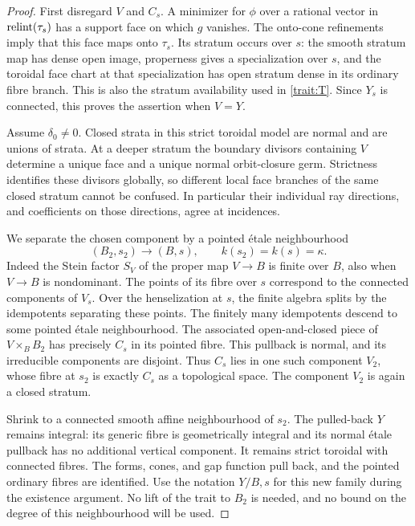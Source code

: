 \begin{proof}
First disregard $V$ and $C_s$.  A minimizer for $\phi$ over a rational
vector in $\operatorname{relint}(\tau_s)$ has a support face on which $g$ vanishes.
The onto-cone refinements imply that this face maps onto $\tau_s$.
Its stratum occurs over $s$: the smooth stratum map has dense open
image, properness gives a specialization over $s$, and the toroidal
face chart at that specialization has open stratum dense in its
ordinary fibre branch.  This is also the stratum availability used
in \eqref{trait:T}.  Since $Y_s$ is connected, this proves the assertion
when $V=Y$.

Assume $\delta_0\ne0$.  Closed strata in this strict toroidal model
are normal and are unions of strata.  At a deeper stratum the boundary
divisors containing $V$ determine a unique face and a unique normal
orbit-closure germ.  Strictness identifies these divisors globally,
so different local face branches of the same closed stratum cannot
be confused.  In particular their individual ray directions, and
coefficients on those directions, agree at incidences.

We separate the chosen component by a pointed \'{e}tale neighbourhood
\[
 (B_2,s_2)\longrightarrow(B,s),\qquad k(s_2)=k(s)=\kappa.
\]
Indeed the Stein factor $S_V$ of the proper map $V\to B$ is finite
over $B$, also when $V\to B$ is nondominant.  The points of its fibre
over $s$ correspond to the connected components of $V_s$.  Over
the henselization at $s$, the finite algebra splits by the idempotents
separating these points.  The finitely many idempotents descend to
some pointed \'{e}tale neighbourhood.  The associated open-and-closed
piece of $V\times_B B_2$ has precisely $C_s$ in its pointed fibre.
This pullback is normal, and its irreducible components are disjoint.
Thus $C_s$ lies in one such component $V_2$, whose fibre at $s_2$
is exactly $C_s$ as a topological space.  The component $V_2$ is
again a closed stratum.

Shrink to a connected smooth affine neighbourhood of $s_2$.
The pulled-back $Y$ remains integral: its generic fibre is geometrically
integral and its normal \'{e}tale pullback has no additional
vertical component.  It remains strict toroidal with connected fibres.
The forms, cones, and gap function pull back, and the pointed ordinary
fibres are identified.  Use the notation $Y/B,s$ for this new family
during the existence argument.  No lift of the trait to $B_2$ is
needed, and no bound on the degree of this neighbourhood will be used.


\end{proof}

